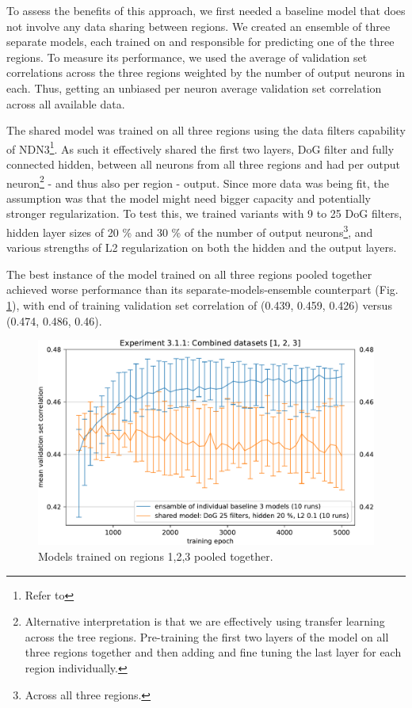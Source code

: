 To assess the benefits of this approach, we first needed a baseline model that does not involve any data sharing between regions. We created an ensemble of three separate models, each trained on and responsible for predicting one of the three regions. To measure its performance, we used the average of validation set correlations across the three regions weighted by the number of output neurons in each. Thus, getting an unbiased per neuron average validation set correlation across all available data.

The shared model was trained on all three regions using the data filters capability of NDN3\footnote{Refer to }. As such it effectively shared the first two layers, DoG filter and fully connected hidden, between all neurons from all three regions and had per output neuron\footnote{Alternative interpretation is that we are effectively using transfer learning across the tree regions. Pre-training the first two layers of the model on all three regions together and then adding and fine tuning the last layer for each region individually.} - and thus also per region - output. Since more data was being fit, the assumption was that the model might need bigger capacity and potentially stronger regularization. To test this, we trained variants with 9 to 25 DoG filters, hidden layer sizes of 20 \% and 30 \% of the number of output neurons\footnote{Across all three regions.}, and various strengths of L2 regularization on both the hidden and the output layers. 

The best instance of the model trained on all three regions pooled together achieved worse performance than its separate-models-ensemble counterpart (Fig. \ref{fig:5.3.1.1_1}), with end of training validation set correlation of (0.439, 0.459, 0.426) versus (0.474, 0.486, 0.46). 

\begin{figure}[H]
    \centering
    \includegraphics[width=1\textwidth]{../figures/05_3_1_1_1}
    \caption[Experiment 3.1.1]{Models trained on regions 1,2,3 pooled together\protect\footnotemark.}
    \label{fig:5.3.1.1_1}
\end{figure}

